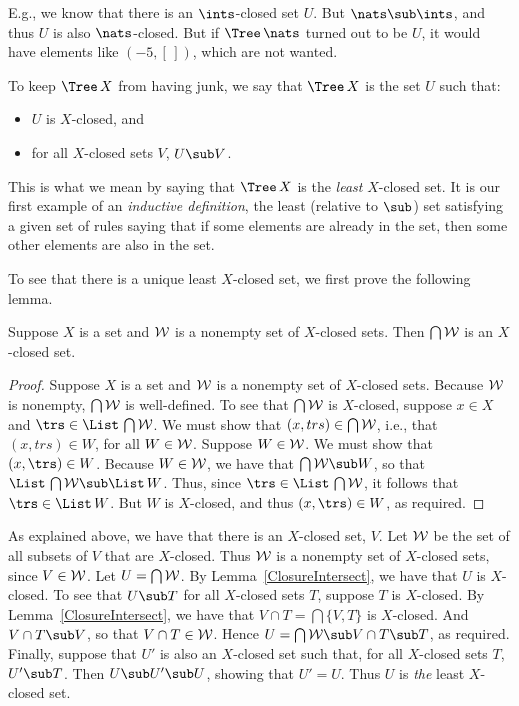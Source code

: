 E.g., we know that there is an $\ints$-closed set $U$.  But
$\nats\sub\ints$, and thus $U$ is also $\nats$-closed.  But if
$\Tree\,\nats$ turned out to be $U$, it would have elements like
$(-5,[\,])$, which are not wanted.

To keep $\Tree\,X$ from having junk, we say that $\Tree\,X$ is
the set $U$ such that:
\begin{itemize}
\item $U$ is $X$-closed, and

\item for all $X$-closed sets $V$, $U\sub V$.
\end{itemize}
This is what we mean by saying that $\Tree\,X$ is the \emph{least}
$X$-closed set.  It is our first example of an \emph{inductive
  definition}, the least (relative to $\sub$) set satisfying
a given set of rules saying that if some elements are already in
the set, then some other elements are also in the set.

To see that there is a unique least $X$-closed set, we first
prove the following lemma.

\begin{lemma}
\label{ClosureIntersect}
Suppose $X$ is a set and $\cal W$ is a nonempty set of $X$-closed sets.
Then $\bigcap{\cal W}$ is an $X$-closed set.
\end{lemma}

\begin{proof}
Suppose $X$ is a set and $\cal W$ is a nonempty set of $X$-closed
sets.  Because $\cal W$ is nonempty, $\bigcap\cal W$ is well-defined.
To see that $\bigcap{\cal W}$ is $X$-closed, suppose $x\in X$ and
$\trs\in\List\,\bigcap{\cal W}$.  We must show that $(x,trs)\in
\bigcap{\cal W}$, i.e., that $(x,trs)\in W$, for all $W\in\cal W$.
Suppose $W\in\cal W$.  We must show that $(x,\trs)\in W$.  Because
$W\in\cal W$, we have that $\bigcap{\cal W}\sub W$, so that
$\List\,\bigcap{\cal W}\sub\List\,W$.  Thus, since
$\trs\in\List\,\bigcap{\cal W}$, it follows that $\trs\in\List\,W$.
But $W$ is $X$-closed, and thus $(x,\trs)\in W$, as required.
\end{proof}

As explained above, we have that there is an $X$-closed set, $V$.  Let
$\cal W$ be the set of all subsets of $V$ that are $X$-closed.  Thus
$\cal W$ is a nonempty set of $X$-closed sets, since $V\in\cal W$.
Let $U=\bigcap{\cal W}$.  By Lemma~\ref{ClosureIntersect}, we have
that $U$ is $X$-closed.  To see that $U\sub T$ for all $X$-closed sets
$T$, suppose $T$ is $X$-closed.  By Lemma~\ref{ClosureIntersect}, we
have that $V\cap T=\bigcap\{V,T\}$ is $X$-closed.  And $V\cap T\sub
V$, so that $V\cap T\in\cal W$.  Hence $U=\bigcap{\cal W}\sub V\cap
T\sub T$, as required.  Finally, suppose that $U'$ is also an
$X$-closed set such that, for all $X$-closed sets $T$, $U'\sub T$.
Then $U\sub U'\sub U$, showing that $U'=U$.  Thus $U$ is \emph{the} least
$X$-closed set.

